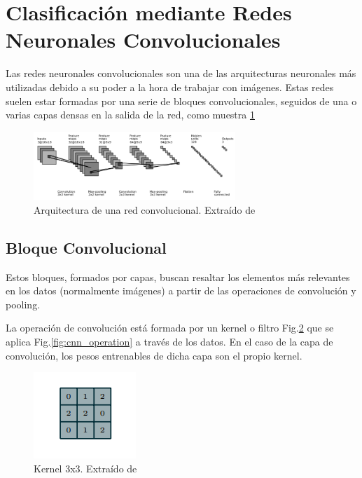 
\section{Clasificación mediante Redes Neuronales
Convolucionales}\label{}

Las redes neuronales convolucionales son una de las arquitecturas
neuronales más utilizadas debido a su poder a la hora de trabajar con
imágenes. Estas redes suelen estar formadas por una serie de bloques
convolucionales, seguidos de una o varias capas densas en la salida de
la red, como muestra \ref{fig:bloque_conv}

\begin{figure}
\centering
\label{fig:bloque_conv}
\includegraphics[width=2.99679in,height=1.01667in]{img/memoria/3/cnn.png}
\caption{Arquitectura de una red convolucional. Extraído de \cite{CNN_architecture} }
\end{figure}
\hypertarget{bloque-convolucional}{%
\subsection{Bloque Convolucional}\label{bloque-convolucional}}

Estos bloques, formados por capas, buscan resaltar los elementos más
relevantes en los datos (normalmente imágenes) a partir de las
operaciones de convolución y pooling.

La operación de convolución está formada por un kernel o filtro Fig.\ref{fig:kernel} que se
aplica Fig.\ref{fig:cnn_operation} a través de los datos. En el caso de la capa de convolución, los
pesos entrenables de dicha capa son el propio kernel.

\begin{figure}
    \centering
    \label{fig:kernel}
    \includegraphics[]{img/memoria/3/kernel.png}
    \caption{Kernel 3x3. Extraído de \cite{convolution_guide}}
\end{figure}

